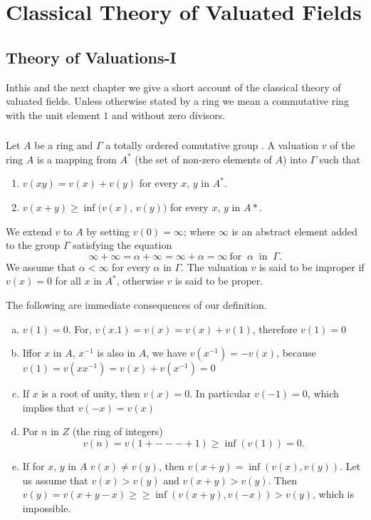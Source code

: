 \part{Classical Theory of Valuated Fields}\label{part1}

\chapter{Theory of Valuations-I}\label{part1:chap1}

In\pageoriginale this and the next chapter we give a short account of the classical
theory of valuated fields. Unless otherwise stated by a ring we mean a
commutative ring with the unit element $1$ and without zero
divisors. 

\section{}\label{part1:chap1:sec1}

\begin{defi*}
  Let $A$ be a ring and $\Gamma$ a totally ordered comutative group
  \cite{1}. A valuation $v$ of the ring $A$ is a mapping from $A^*$ (the
  set of non-zero elements of $A$) into $\Gamma$ such that  
  \begin{enumerate}[\rm(I)]
  \item $ v(xy) = v(x) + v(y)$ for every $x$, $y$ in $A^*$.
  \item $v(x + y ) \geq \inf (v(x)$, $v(y))$ for every $x$, $y$  in $A*$.
  \end{enumerate}
  We extend $v$ to $A$ by setting $v(0)=\infty$; where $\infty$ is an
  abstract element added to the group $\Gamma$ satisfying the equation  
  $$
  \infty + \infty = \alpha + \infty = \infty + \alpha = \infty ~\text{
  for }~ \alpha ~\text { in }~ \Gamma.  
  $$
  We assume that $\alpha < \infty $ for every $\alpha$ in
  $\Gamma$. The valuation $v$ is said to be improper if $v(x)=0$ for
  all $x$ in $A^*$, otherwise $v$ is said to be proper. 
\end{defi*}

The  following are immediate consequences of our definition. 
\begin{enumerate}[(a)]
\item $v(1) = 0$. For, $v (x.1)=v(x)=v(x)+v(1)$, therefore $v(1)=0$ 
\item If\pageoriginale for $x$ in $A$, $x^{-1}$ is also in $A$, we have $v(x^{-1}) =
  -v(x)$, because $v(1)= v (x x^{-1})= v(x)+v(x^{-1})=0$ 
\item If $x$ is a root of unity, then $v(x) = 0$. In particular
  $v(-1)=0$, which implies that $v(-x) = v (x)$ 
\item Por $n$ in $Z$ (the ring of integers)
  $$
  v(n) = v(1+ ---+1) \geq \inf (v(1)) = 0.
  $$
\item If for $x$, $y$ in  $A$ $v (x)\neq v (y)$, then $v(x+y)= \inf (v(x),
  v(y))$. Let us assume that $v(x) > v (y)$ and $v(x +y )> v
  (y)$. Then $v(y)=v(x + y - x ) \geq \geq \inf (v(x+y), v(-x))>
  v(y)$, which is impossible.  
\end{enumerate}

